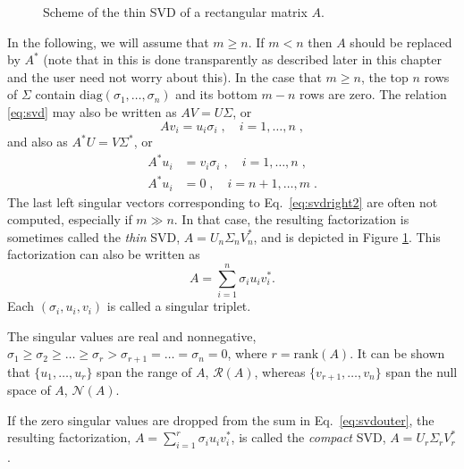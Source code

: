 \begin{figure}
\centering
{}
\caption{\label{fig:svd}Scheme of the thin SVD of a rectangular matrix $A$.}
\end{figure}

In the following, we will assume that $m\geq n$. If $m<n$ then $A$ should be replaced by $A^*$ (note that in \slepc this is done transparently as described later in this chapter and the user need not worry about this). In the case that $m\geq n$, the top $n$ rows of $\Sigma$ contain $\mathrm{diag}(\sigma_1,\ldots,\sigma_n)$ and its bottom $m-n$ rows are zero. The relation \ref{eq:svd} may also be written as $AV=U\Sigma$, or
\begin{equation}
\label{eq:svdleft}
Av_i=u_i\sigma_i\;,\quad i=1,\ldots,n\;,
\end{equation}
and also as $A^*U=V\Sigma^*$, or
\begin{align}
\label{eq:svdright}
A^*u_i&=v_i\sigma_i\;,\quad i=1,\ldots,n\;,\\
\label{eq:svdright2}
A^*u_i&=0\;,\quad i=n+1,\ldots,m\;.
\end{align}
The last left singular vectors corresponding to Eq.\ \ref{eq:svdright2} are often not computed, especially if $m\gg n$. In that case, the resulting factorization is sometimes called the \emph{thin} SVD, $A=U_n\Sigma_n V_n^*$, and is depicted in Figure \ref{fig:svd}. This factorization can also be written as
\begin{equation}
\label{eq:svdouter}
A=\sum_{i=1}^{n}\sigma_iu_iv_i^*.
\end{equation}
Each $(\sigma_i,u_i,v_i)$ is called a singular triplet.

The singular values are real and nonnegative, $\sigma_1\geq\sigma_2\geq\ldots\geq\sigma_r>\sigma_{r+1}=\ldots=\sigma_n=0$, where $r=\mathrm{rank}(A)$. It can be shown that $\{u_1,\ldots,u_r\}$ span the range of $A$, $\mathcal{R}(A)$, whereas $\{v_{r+1},\ldots,v_n\}$ span the null space of $A$, $\mathcal{N}(A)$.

If the zero singular values are dropped from the sum in Eq.\ \ref{eq:svdouter}, the resulting factorization, $A=\sum_{i=1}^{r}\sigma_iu_iv_i^*$, is called the \emph{compact} SVD, $A=U_r\Sigma_r V_r^*$.

